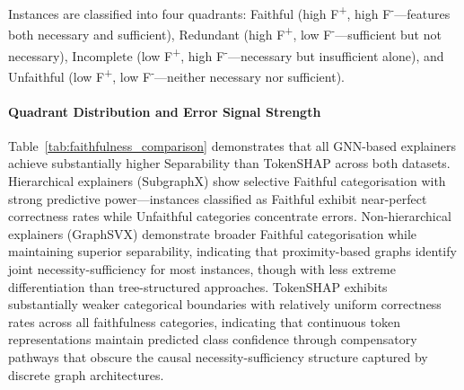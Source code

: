 \documentclass[preprint, times, review, 10pt]{elsarticle}
\begin{document}
Instances are classified into four quadrants: Faithful (high F\textsuperscript{+}, high F\textsuperscript{-}—features both necessary and sufficient), Redundant (high F\textsuperscript{+}, low F\textsuperscript{-}—sufficient but not necessary), Incomplete (low F\textsuperscript{+}, high F\textsuperscript{-}—necessary but insufficient alone), and Unfaithful (low F\textsuperscript{+}, low F\textsuperscript{-}—neither necessary nor sufficient).

\paragraph{Quadrant Distribution and Error Signal Strength} 
Table~\ref{tab:faithfulness_comparison} demonstrates that all GNN-based explainers achieve substantially higher Separability than TokenSHAP across both datasets. Hierarchical explainers (SubgraphX) show selective Faithful categorisation with strong predictive power—instances classified as Faithful exhibit near-perfect correctness rates while Unfaithful categories concentrate errors. Non-hierarchical explainers (GraphSVX) demonstrate broader Faithful categorisation while maintaining superior separability, indicating that proximity-based graphs identify joint necessity-sufficiency for most instances, though with less extreme differentiation than tree-structured approaches. TokenSHAP exhibits substantially weaker categorical boundaries with relatively uniform correctness rates across all faithfulness categories, indicating that continuous token representations maintain predicted class confidence through compensatory pathways that obscure the causal necessity-sufficiency structure captured by discrete graph architectures.
\end{document}
